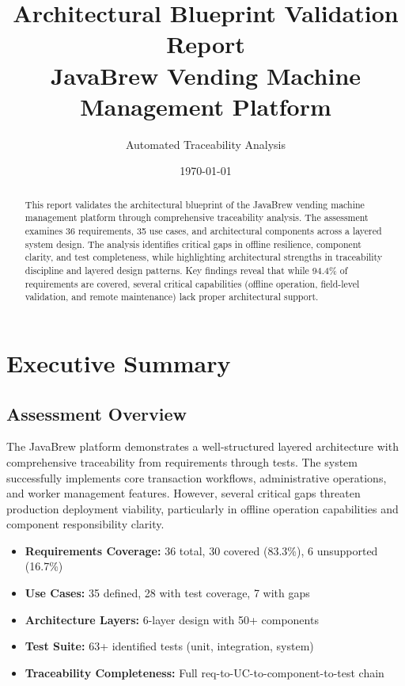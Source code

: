 \documentclass[11pt,a4paper]{article}
\title{\textbf{Architectural Blueprint Validation Report}\\
\large JavaBrew Vending Machine Management Platform}
\author{Automated Traceability Analysis}
\date{\today}
\begin{document}
\maketitle

\begin{abstract}
This report validates the architectural blueprint of the JavaBrew vending machine management platform through comprehensive traceability analysis. The assessment examines 36 requirements, 35 use cases, and architectural components across a layered system design. The analysis identifies critical gaps in offline resilience, component clarity, and test completeness, while highlighting architectural strengths in traceability discipline and layered design patterns. Key findings reveal that while 94.4\% of requirements are covered, several critical capabilities (offline operation, field-level validation, and remote maintenance) lack proper architectural support.
\end{abstract}

\tableofcontents
\newpage

\section{Executive Summary}

\subsection{Assessment Overview}

The JavaBrew platform demonstrates a well-structured layered architecture with comprehensive traceability from requirements through tests. The system successfully implements core transaction workflows, administrative operations, and worker management features. However, several critical gaps threaten production deployment viability, particularly in offline operation capabilities and component responsibility clarity.

\begin{tcolorbox}[colback=infocolor!5,colframe=infocolor,title=\textbf{Key Metrics}]
\begin{itemize}[leftmargin=*]
    \item \textbf{Requirements Coverage:} 36 total, 30 covered (83.3\%), 6 unsupported (16.7\%)
    \item \textbf{Use Cases:} 35 defined, 28 with test coverage, 7 with gaps
    \item \textbf{Architecture Layers:} 6-layer design with 50+ components
    \item \textbf{Test Suite:} 63+ identified tests (unit, integration, system)
    \item \textbf{Traceability Completeness:} Full req-to-UC-to-component-to-test chain
\end{itemize}
\end{tcolorbox}
\end{document}
